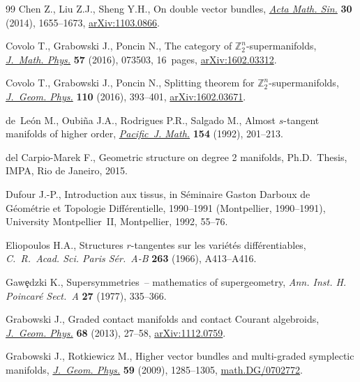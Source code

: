 \documentclass[pdftex]{sigma}
\numberwithin{equation}{section}
\begin{document}
\begin{thebibliography}{99}
Chen Z., Liu Z.J., Sheng Y.H., On double vector bundles, \href{http://dx.doi.org/10.1007/s10114-014-2412-4}{\textit{Acta Math.
  Sin.}} \textbf{30} (2014), 1655--1673, \href{http://arxiv.org/abs/1103.0866}{arXiv:1103.0866}.

Covolo T., Grabowski J., Poncin N., The category of {${\mathbb
  Z}_2^n$}-supermanifolds, \href{http://dx.doi.org/10.1063/1.4955416}{\textit{J.~Math. Phys.}} \textbf{57} (2016), 073503,
  16~pages, \href{http://arxiv.org/abs/1602.03312}{arXiv:1602.03312}.

Covolo T., Grabowski J., Poncin N., Splitting theorem for
  $\mathbb{Z}_{2}^{n}$-supermanifolds, \href{http://dx.doi.org/10.1016/j.geomphys.2016.09.006}{\textit{J.~Geom. Phys.}} \textbf{110}
  (2016), 393--401, \href{http://arxiv.org/abs/1602.03671}{arXiv:1602.03671}.

de~Le{\'o}n M., Oubi{\~n}a J.A., Rodrigues P.R., Salgado M., Almost
  {$s$}-tangent manifolds of higher order, \href{http://projecteuclid.org/euclid.pjm/1102635616}{\textit{Pacific~J. Math.}}
  \textbf{154} (1992), 201--213.

del Carpio-Marek F., Geometric structure on degree 2 manifolds, Ph.D.~Thesis,
  IMPA, Rio de Janeiro, 2015.

Dufour J.-P., Introduction aux tissus, in S\'eminaire {G}aston {D}arboux de
  {G}\'eom\'etrie et {T}opologie {D}if\/f\'erentielle, 1990--1991 ({M}ontpellier,
  1990--1991), University Montpellier~II, Montpellier, 1992, 55--76.

Eliopoulos H.A., Structures {$r$}-tangentes sur les vari\'et\'es
  dif\/f\'erentiables, \textit{C.~R.~Acad. Sci. Paris S\'er.~A-B} \textbf{263}
  (1966), A413--A416.

Gaw\c{e}dzki K., Supersymmetries~-- mathematics of supergeometry, \textit{Ann.
  Inst. H. Poincar\'e Sect.~A} \textbf{27} (1977), 335--366.

Grabowski J., Graded contact manifolds and contact {C}ourant algebroids,
  \href{http://dx.doi.org/10.1016/j.geomphys.2013.02.001}{\textit{J.~Geom. Phys.}} \textbf{68} (2013), 27--58, \href{http://arxiv.org/abs/1112.0759}{arXiv:1112.0759}.

Grabowski J., Rotkiewicz M., Higher vector bundles and multi-graded symplectic
  manifolds, \href{http://dx.doi.org/10.1016/j.geomphys.2009.06.009}{\textit{J.~Geom. Phys.}} \textbf{59} (2009), 1285--1305,
  \href{http://arxiv.org/abs/math.DG/0702772}{math.DG/0702772}.


\end{thebibliography}
\end{document}
